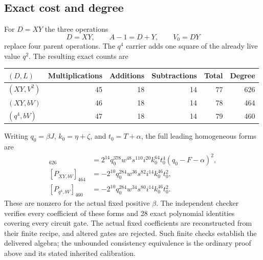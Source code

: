 \subsection{Exact cost and degree}

For $D=XY$ the three operations
\[
 D=XY,\qquad A-1=D+Y,\qquad V_0=DY
\]
replace four parent operations. The $q^4$ carrier adds one square of the
already live value $q^2$. The resulting exact counts are
\begin{center}
\begin{tabular}{lrrrrr}
\hline
$(D,L)$&Multiplications&Additions&Subtractions&Total&Degree\\
\hline
$(XY,V^2)$&45&18&14&77&626\\
$(XY,bV)$&46&18&14&78&464\\
$(q^4,bV)$&47&18&14&79&460\\
\hline
\end{tabular}
\end{center}
Writing $q_0=\beta J$, $k_0=\eta+\zeta$, and $t_0=T+\alpha$, the full
leading homogeneous forms are
\begin{align*}
 [P_{XY,V^2}]_{626}
 &=2^{14}q_0^{378}w^{48}s^{110}i^{20}k_0^{64}t_0^4
       (q_0-F-\alpha)^2,\\
 [P_{XY,bV}]_{464}
 &=-2^{10}q_0^{284}w^{36}s^{82}i^{14}k_0^{46}t_0^2,\\
 [P_{q^4,bV}]_{460}
 &=-2^{10}q_0^{284}w^{34}s^{80}i^{14}k_0^{46}t_0^2.
\end{align*}
These are nonzero for the actual fixed positive $\beta$. The independent
checker verifies every coefficient of these forms and 28 exact polynomial
identities covering every circuit gate. The actual fixed coefficients are
reconstructed from their finite recipe, and altered gates are rejected.
Such finite checks establish the delivered algebra; the unbounded
consistency equivalence is the ordinary proof above and its stated
inherited calibration.
